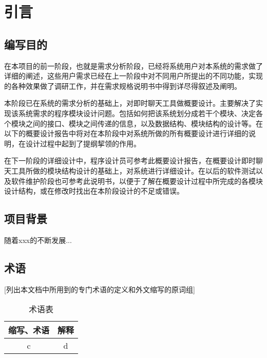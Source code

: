 \chapter{引言}

\section{编写目的}
在本项目的前一阶段，也就是需求分析阶段，已经将系统用户对本系统的需求做了详细的阐述，这些用户需求已经在上一阶段中对不同用户所提出的不同功能，实现的各种效果做了调研工作，并在需求规格说明书中得到详尽得叙述及阐明。

本阶段已在系统的需求分析的基础上，对即时聊天工具做概要设计。主要解决了实现该系统需求的程序模块设计问题。包括如何把该系统划分成若干个模块、决定各个模块之间的接口、模块之间传递的信息，以及数据结构、模块结构的设计等。在以下的概要设计报告中将对在本阶段中对系统所做的所有概要设计进行详细的说明，在设计过程中起到了提纲挈领的作用。

在下一阶段的详细设计中，程序设计员可参考此概要设计报告，在概要设计即时聊天工具所做的模块结构设计的基础上，对系统进行详细设计。在以后的软件测试以及软件维护阶段也可参考此说明书，以便于了解在概要设计过程中所完成的各模块设计结构，或在修改时找出在本阶段设计的不足或错误。


\section{项目背景}
随着xxx的不断发展...

\section{术语}
[列出本文档中所用到的专门术语的定义和外文缩写的原词组]
\begin{table}[htbp]
\centering
\caption{术语表} \label{tab:terminology}
\begin{tabular}{|c|c|}
    \hline
    缩写、术语 & 解释 \\
    \hline
    c & d \\
    \hline
\end{tabular}
\end{table}